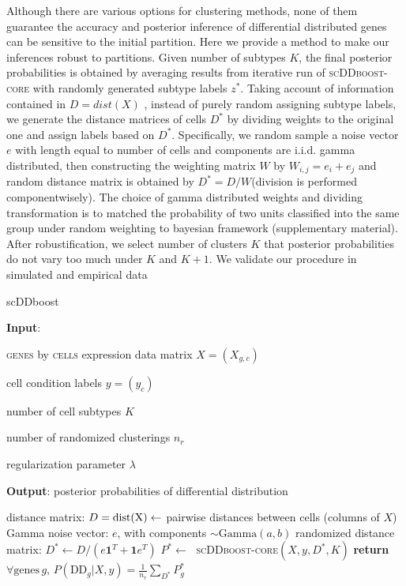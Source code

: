 \documentclass[11pt]{amsart}
\begin{document}
Although there are various options for clustering methods, none of them guarantee the accuracy and posterior inference of differential distributed genes can be sensitive to the initial partition. Here we provide a method to make our inferences robust to partitions. Given number of subtypes $K$, the final posterior probabilities is obtained by averaging results from iterative run of \textsc{scDDboost-core}  with randomly generated subtype labels $z^*$. Taking account of information contained in $D = dist(X)$ , instead of purely random assigning subtype labels, we generate the distance matrices of cells $D^*$ by dividing weights to the original one and assign labels based on $D^*$. Specifically,  we random sample a noise vector $e$ with length equal to number of cells and components are i.i.d. gamma distributed,  then constructing the weighting matrix $W$ by $W_{i,j} = e_i + e_j$ and random distance matrix is obtained by $D^* = D /  W$(division is performed componentwisely).  The choice of gamma distributed weights and dividing transformation is to matched the probability of two units classified into the same group under random weighting to bayesian framework (supplementary material). 
After robustification, we select number of clusters $K$ that posterior probabilities do not vary too
 much under $K$ and $K+1$.  We validate our procedure in simulated and empirical data


\begin{algorithm}
\caption{scDDboost}\label{alg:scDDboost}
\raggedright\hspace*{\algorithmicindent} \textbf{Input}: \begin{list}{}{}
 \item  \textsc{genes} by \textsc{cells} expression data matrix $X=(X_{g,c})$
 \item  cell condition labels $y=(y_c)$
 \item  number of cell subtypes $K$
 \item number of randomized clusterings $n_r$ 
 \item regularization parameter $\lambda$   
 \end{list}
\hspace*{\algorithmicindent} \textbf{Output}: posterior probabilities of differential distribution 
\begin{algorithmic}[2]
\State distance matrix: $D=\rm{dist}(X) \gets$ pairwise distances between cells (columns of $X$)
\Repeat
\State Gamma noise vector: $e$, with components $\sim \text{Gamma}(a,b)$
\State randomized distance matrix: $D^* \gets D / (e\textbf{1}^T +  \textbf{1}e^T)$
\State $P^* \gets\;$ \textsc{scDDboost-core}$(X,y,D^*,K)$
\State \textbf{return} $\forall \text{genes} \, g, \, P(\text{DD}_g|X,y) = \frac{1}{n_r} 
   \sum_{D^*} P^*_g$
\EndProcedure
\end{algorithmic}
\end{algorithm}
\end{document}
